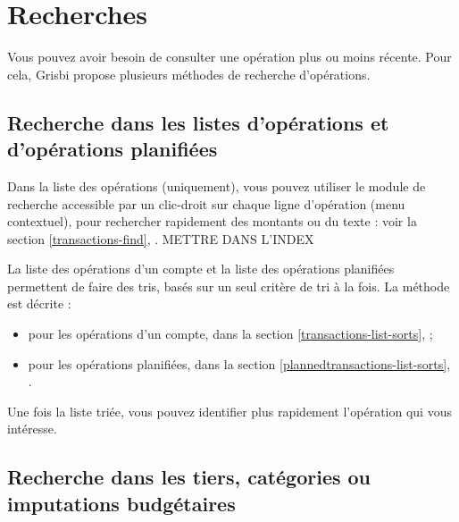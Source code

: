 
\chapter{Recherches\label{search} }

Vous pouvez avoir besoin de consulter une opération plus ou moins récente. Pour cela, Grisbi propose plusieurs méthodes de recherche d'opérations.


\section{Recherche dans les listes d'opérations et d'opérations planifiées\label{search-list} }

Dans la liste des opérations (uniquement), vous pouvez utiliser le module de recherche accessible par un clic-droit sur chaque ligne d'opération (menu contextuel), pour rechercher rapidement des montants ou du texte : voir la section \vref{transactions-find}, .
METTRE DANS L'INDEX


La liste des opérations d'un compte et la liste des opérations planifiées permettent de faire des tris, basés sur un seul critère de tri à la fois. La méthode est décrite :

\begin{itemize}
	 \item pour les opérations d'un compte, dans la section \vref{transactions-list-sorts},  ;
	 \item pour les opérations planifiées, dans la section \vref{plannedtransactions-list-sorts}, .
\end{itemize}

Une fois la liste triée, vous pouvez identifier plus rapidement l'opération qui vous intéresse.


\section{Recherche dans les tiers, catégories ou imputations budgétaires\label{search-simple} }


